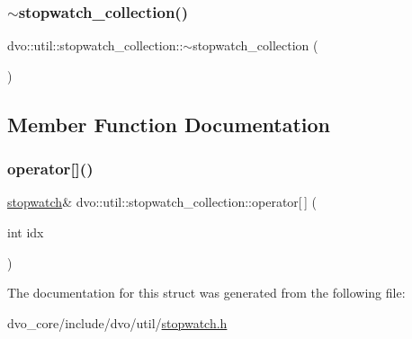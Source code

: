 \mbox{\label{structdvo_1_1util_1_1stopwatch__collection_afbdd3c89b3f56c4343c2169c7d045a5c}} 
\subsubsection{\texorpdfstring{$\sim$stopwatch\+\_\+collection()}{~stopwatch\_collection()}}
{\footnotesize\ttfamily dvo\+::util\+::stopwatch\+\_\+collection\+::$\sim$stopwatch\+\_\+collection (\begin{DoxyParamCaption}{ }\end{DoxyParamCaption})\hspace{0.3cm}{\ttfamily [inline]}}



\subsection{Member Function Documentation}
\mbox{\label{structdvo_1_1util_1_1stopwatch__collection_afac648451b26aeb38a3903f651323701}} 
\subsubsection{\texorpdfstring{operator[]()}{operator[]()}}
{\footnotesize\ttfamily \mbox{\hyperlink{structdvo_1_1util_1_1stopwatch}{stopwatch}}\& dvo\+::util\+::stopwatch\+\_\+collection\+::operator\mbox{[}$\,$\mbox{]} (\begin{DoxyParamCaption}\item[{int}]{idx }\end{DoxyParamCaption})\hspace{0.3cm}{\ttfamily [inline]}}



The documentation for this struct was generated from the following file\+:\begin{DoxyCompactItemize}
\item 
dvo\+\_\+core/include/dvo/util/\mbox{\hyperlink{stopwatch_8h}{stopwatch.\+h}}\end{DoxyCompactItemize}
